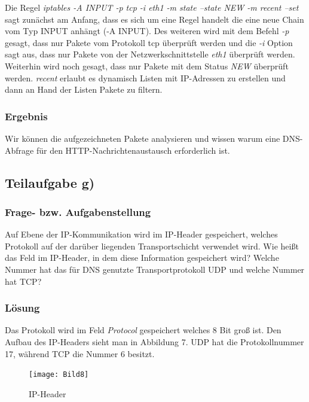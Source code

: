 Die Regel \textit{iptables -A INPUT -p tcp -i eth1 -m state --state NEW -m recent --set} sagt zunächst am Anfang, dass es sich um eine Regel handelt die eine neue Chain vom Typ INPUT anhängt (-A INPUT). Des weiteren wird mit dem Befehl \textit{-p} gesagt, dass nur Pakete vom Protokoll tcp überprüft werden und die \textit{-i} Option sagt aus, dass nur Pakete von der Netzwerkschnittstelle \textit{eth1} überprüft werden. Weiterhin wird noch gesagt, dass nur Pakete mit dem Status \textit{NEW} überprüft werden. \textit{recent} erlaubt es dynamisch Listen mit IP-Adressen zu erstellen und dann an Hand der Listen Pakete zu filtern.


\subsubsection{Ergebnis}

Wir können die aufgezeichneten Pakete analysieren und wissen warum eine DNS-Abfrage für den HTTP-Nachrichtenaustausch erforderlich ist.


\subsection{Teilaufgabe g)}

\subsubsection{Frage- bzw. Aufgabenstellung}

Auf Ebene der IP-Kommunikation wird im IP-Header gespeichert, welches Protokoll auf der darüber liegenden Transportschicht verwendet wird. Wie heißt das Feld im IP-Header, in dem diese Information gespeichert wird? Welche Nummer hat das für DNS genutzte Transportprotokoll UDP und welche Nummer hat TCP?


\subsubsection{Lösung}

Das Protokoll wird im Feld \textit{Protocol} gespeichert welches 8 Bit groß ist. Den Aufbau des IP-Headers sieht man in Abbildung 7.\cite{[1]} UDP hat die Protokollnummer 17, während TCP die Nummer 6 besitzt.\cite{[2]}

\begin{figure}[htbp]
\begin{center}
\texttt{[image: Bild8]}
\caption{IP-Header}
\end{center}
\end{figure}

